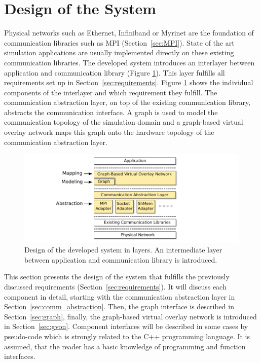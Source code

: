 \section{Design of the System}

Physical networks such as Ethernet, Infiniband or Myrinet are the
foundation of communication libraries such as MPI
(Section~\ref{sec:MPI}).  State of the art simulation applications are
usually implemented directly on these existing communication
libraries. The developed system introduces an interlayer between
application and communication library (Figure \ref{fig:design}). This
layer fulfills all requirements set up in
Section~\ref{sec:requirements}. Figure \ref{fig:design} shows the
individual components of the interlayer and which requirement they
fulfill. The communication abstraction layer, on top of the existing
communication library, abstracts the communication interface.  A graph
is used to model the communication topology of the simulation domain
and a graph-based virtual overlay network maps this graph onto the
hardware topology of the communication abstraction layer.

\begin{figure}[H]
  \centering \includegraphics[width=\textwidth]{graphics/30_design}
  \caption{Design of the developed system in layers. An intermediate
  layer between application and communication library is introduced.}
  \label{fig:design}
\end{figure}


This section presents the design of the system that fulfills the
previously discussed requirements (Section~\ref{sec:requirements}).
It will discuss each component in detail, starting with the
communication abstraction layer in
Section~\ref{sec:comm_abstraction}. Then, the graph interface is
described in Section~\ref{sec:graph}, finally, the graph-based virtual
overlay network is introduced in Section~\ref{sec:gvon}. Component
interfaces will be described in some cases by pseudo-code which is
strongly related to the C++ programming language. It is assumed, that
the reader has a basic knowledge of programming and function
interfaces.

